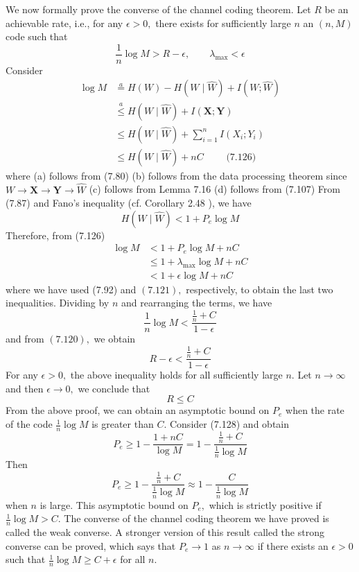 \documentclass[8pt]{article}
\begin{document}
We now formally prove the converse of the channel coding theorem. Let $R$ be an achievable rate, i.e., for any $\epsilon>0,$ there exists for sufficiently large $n$ an $(n, M)$ code such that
$$
\frac{1}{n} \log M>R-\epsilon, \qquad
\lambda_{\max }<\epsilon
$$
Consider
$$
\begin{aligned}
\log M & \stackrel{a}{=} H(W) -H(W \mid \hat{W})+I(W ; \hat{W}) \\
& \stackrel{a}{\leq} H(W \mid \hat{W})+I(\mathbf{X} ; \mathbf{Y}) \\
& \leq H(W \mid \hat{W})+\sum_{i=1}^{n} I\left(X_{i} ; Y_{i}\right) \\
& \leq H(W \mid \hat{W})+n C \qquad \text{ (7.126)}
\end{aligned}
$$
where
(a) follows from (7.80)
(b) follows from the data processing theorem since $W \rightarrow \mathbf{X} \rightarrow \mathbf{Y} \rightarrow \hat{W}$
(c) follows from Lemma 7.16
(d) follows from (7.107)
From (7.87) and Fano's inequality (cf. Corollary 2.48 ), we have
$$
H(W \mid \hat{W})<1+P_{e} \log M
$$
Therefore, from (7.126)
$$
\begin{aligned}
\log M &<1+P_{e} \log M+n C \\
& \leq 1+\lambda_{\max } \log M+n C \\
&<1+\epsilon \log M+n C
\end{aligned}
$$
where we have used (7.92) and $(7.121),$ respectively, to obtain the last two inequalities. Dividing by $n$ and rearranging the terms, we have
$$
\frac{1}{n} \log M<\frac{\frac{1}{n}+C}{1-\epsilon}
$$
and from $(7.120),$ we obtain
$$
R-\epsilon<\frac{\frac{1}{n}+C}{1-\epsilon}
$$
For any $\epsilon>0,$ the above inequality holds for all sufficiently large $n .$ Let $n \rightarrow \infty$ and then $\epsilon \rightarrow 0,$ we conclude that
$$
R \leq C
$$
From the above proof, we can obtain an asymptotic bound on $P_{e}$ when the rate of the code $\frac{1}{n} \log M$ is greater than $C$. Consider (7.128) and obtain
$$
P_{e} \geq 1-\frac{1+n C}{\log M}=1-\frac{\frac{1}{n}+C}{\frac{1}{n} \log M}
$$
Then
$$
P_{e} \geq 1-\frac{\frac{1}{n}+C}{\frac{1}{n} \log M} \approx 1-\frac{C}{\frac{1}{n} \log M}
$$
when $n$ is large. This asymptotic bound on $P_{e},$ which is strictly positive if $\frac{1}{n} \log M>C$. The converse of the channel coding theorem we have proved is called the weak converse. A stronger version of this result called the strong converse can be proved, which says that $P_{e} \rightarrow 1$ as $n \rightarrow \infty$ if there exists an $\epsilon>0$ such that $\frac{1}{n} \log M \geq C+\epsilon$ for all $n$.
\end{document}
